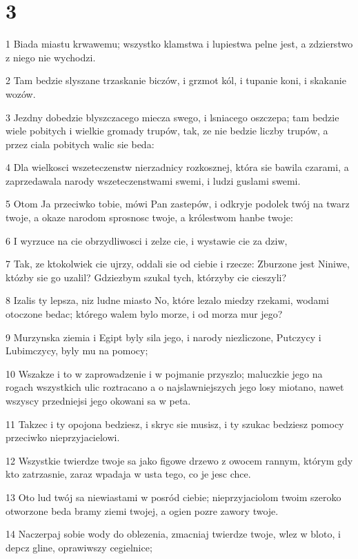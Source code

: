 \chapter{3}

\par 1 Biada miastu krwawemu; wszystko klamstwa i lupiestwa pelne jest, a zdzierstwo z niego nie wychodzi.
\par 2 Tam bedzie slyszane trzaskanie biczów, i grzmot kól, i tupanie koni, i skakanie wozów.
\par 3 Jezdny dobedzie blyszczacego miecza swego, i lsniacego oszczepa; tam bedzie wiele pobitych i wielkie gromady trupów, tak, ze nie bedzie liczby trupów, a przez ciala pobitych walic sie beda:
\par 4 Dla wielkosci wszeteczenstw nierzadnicy rozkosznej, która sie bawila czarami, a zaprzedawala narody wszeteczenstwami swemi, i ludzi guslami swemi.
\par 5 Otom Ja przeciwko tobie, mówi Pan zastepów, i odkryje podolek twój na twarz twoje, a okaze narodom sprosnosc twoje, a królestwom hanbe twoje:
\par 6 I wyrzuce na cie obrzydliwosci i zelze cie, i wystawie cie za dziw,
\par 7 Tak, ze ktokolwiek cie ujrzy, oddali sie od ciebie i rzecze: Zburzone jest Niniwe, któzby sie go uzalil? Gdziezbym szukal tych, którzyby cie cieszyli?
\par 8 Izalis ty lepsza, niz ludne miasto No, które lezalo miedzy rzekami, wodami otoczone bedac; którego walem bylo morze, i od morza mur jego?
\par 9 Murzynska ziemia i Egipt byly sila jego, i narody niezliczone, Putczycy i Lubimczycy, byly mu na pomocy;
\par 10 Wszakze i to w zaprowadzenie i w pojmanie przyszlo; maluczkie jego na rogach wszystkich ulic roztracano a o najslawniejszych jego losy miotano, nawet wszyscy przedniejsi jego okowani sa w peta.
\par 11 Takzec i ty opojona bedziesz, i skryc sie musisz, i ty szukac bedziesz pomocy przeciwko nieprzyjacielowi.
\par 12 Wszystkie twierdze twoje sa jako figowe drzewo z owocem rannym, którym gdy kto zatrzasnie, zaraz wpadaja w usta tego, co je jesc chce.
\par 13 Oto lud twój sa niewiastami w posród ciebie; nieprzyjaciolom twoim szeroko otworzone beda bramy ziemi twojej, a ogien pozre zawory twoje.
\par 14 Naczerpaj sobie wody do oblezenia, zmacniaj twierdze twoje, wlez w bloto, i depcz gline, oprawiwszy cegielnice;

